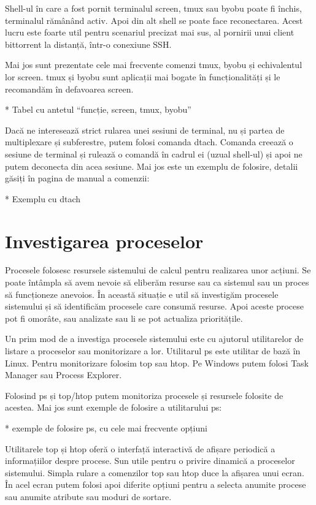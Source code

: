 Shell-ul în care a fost pornit terminalul screen, tmux sau byobu poate fi
închis, terminalul rămânând activ. Apoi din alt shell se poate face
reconectarea. Acest lucru este foarte util pentru scenariul precizat mai sus, al
pornirii unui client bittorrent la distanță, într-o conexiune SSH.

Mai jos sunt prezentate cele mai frecvente comenzi tmux, byobu și echivalentul
lor screen. tmux și byobu sunt aplicații mai bogate în funcționalități și le
recomandăm în defavoarea screen.

* Tabel cu antetul “funcție, screen, tmux, byobu”

Dacă ne interesează strict rularea unei sesiuni de terminal, nu și partea de
multiplexare și subferestre, putem folosi comanda dtach. Comanda creează o
sesiune de terminal și rulează o comandă în cadrul ei (uzual shell-ul) și apoi
ne putem deconecta din acea sesiune. Mai jos este un exemplu de folosire,
detalii găsiți în pagina de manual a comenzii:

* Exemplu cu dtach

\section{Investigarea proceselor}
\label{sec:procese-investigare}

Procesele folosesc resursele sistemului de calcul pentru realizarea unor
acțiuni. Se poate întâmpla să avem nevoie să eliberăm resurse sau ca sistemul
sau un proces să funcționeze anevoios. În această situație e util să investigăm
procesele sistemului și să identificăm procesele care consumă resurse. Apoi
aceste procese pot fi omorâte, sau analizate sau li se pot actualiza
prioritățile.

Un prim mod de a investiga procesele sistemului este cu ajutorul utilitarelor de
listare a proceselor sau monitorizare a lor. Utilitarul ps este utilitar de bază
în Linux. Pentru monitorizare folosim top sau htop. Pe Windows putem folosi Task
Manager sau Process Explorer.

Folosind ps și top/htop putem monitoriza procesele și resursele folosite de
acestea. Mai jos sunt exemple de folosire a utilitarului ps:

* exemple de folosire ps, cu cele mai frecvente opțiuni

Utilitarele top și htop oferă o interfață interactivă de afișare periodică a
informațiilor despre procese. Sun utile pentru o privire dinamică a proceselor
sistemului. Simpla rulare a comenzilor top sau htop duce la afișarea unui ecran.
În acel ecran putem folosi apoi diferite opțiuni pentru a selecta anumite
procese sau anumite atribute sau moduri de sortare.

